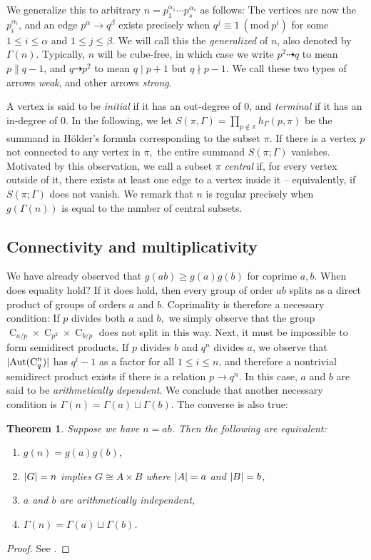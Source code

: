 \documentclass[a4paper, 12pt]{article}
\DeclarePairedDelimiter\abs{\lvert}{\rvert}
\newcommand{\ufdsh}{p_1^{\alpha_1} \cdots p_s^{\alpha_s}}
\newcommand{\aut}[1]{\operatorname{Aut}(#1)}
\newcommand{\cyc}[1]{\operatorname{C}_{#1}}
\newcommand{\Mod}[1]{\ (\mathrm{mod} \ #1)}
\theoremstyle{plain}
\newtheorem{thm}{Theorem}[section]
\theoremstyle{definition}
\begin{document}
We generalize this to arbitrary $n = \ufdsh$ as follows: The vertices are now the $p_i^{\alpha_i}$, and an edge $p^\alpha \rightarrow q^\beta$ exists precisely when $q^j \equiv 1 \Mod{p^i}$ for some $1 \le i \le \alpha$ and $1 \le j \le \beta$. We will call this the \emph{generalized \hg} of $n$, also denoted by $\Gamma(n)$. Typically, $n$ will be cube-free, in which case we write $p^2 \dashrightarrow q$ to mean $p \parallel q - 1$, and $q \dashrightarrow p^2$ to mean $q \mid p + 1$ but $q \nmid p - 1$. We call these two types of arrows \emph{weak}, and other arrows \emph{strong}.

A vertex is said to be \emph{initial} if it has an out-degree of $0$, and \emph{terminal} if it has an in-degree of $0$. In the following, we let $S(\pi, \Gamma) = \prod_{p \notin \pi}h_\Gamma(p, \pi)$ be the summand in Hölder's formula corresponding to the subset $\pi$. If there is a vertex $p$ not connected to any vertex in $\pi,$ the entire summand $S(\pi; \Gamma)$ vanishes. Motivated by this observation, we call a subset $\pi$ \emph{central} if, for every vertex outside of it, there exists at least one edge to a vertex inside it -- equivalently, if $S(\pi; \Gamma)$ does not vanish. We remark that $n$ is regular precisely when $g(\Gamma(n))$ is equal to the number of central subsets.

\subsection{Connectivity and multiplicativity}
We have already observed that $g(ab) \ge g(a)g(b)$ for coprime $a, b$. When does equality hold? If it does hold, then every group of order $ab$ splits as a direct product of groups of orders $a$ and $b.$ Coprimality is therefore a necessary condition: If $p$ divides both $a$ and $b,$ we simply observe that the group $\cyc{a/p} \times \cyc{p^2} \times \cyc{b/p}$ does not split in this way. Next, it must be impossible to form semidirect products. If $p$ divides $b$ and $q^n$ divides $a$, we observe that $\abs{\aut{\cyc{q}^n}}$ has $q^i - 1$ as a factor for all $1 \le i \le n$, and therefore a nontrivial semidirect product exists if there is a relation $p \rightarrow q^n.$ In this case, $a$ and $b$ are said to be \emph{arithmetically dependent}. We conclude that another necessary condition is $\Gamma(n) = \Gamma(a) \sqcup \Gamma(b)$.  The converse is also true:

\begin{thm}
	Suppose we have $n = ab$. Then the following are equivalent:
	\begin{enumerate}
		\item $g(n) = g(a)g(b)$,
		\item $\abs{G} = n$ implies $G \cong A \times B$ where $\abs{A} = a$ and $\abs{B} = b$,
		\item $a$ and $b$ are arithmetically independent,
		\item $\Gamma(n) = \Gamma(a) \sqcup \Gamma(b)$.
	\end{enumerate}
\end{thm}
\begin{proof}
	See {\cite[Lem.~21.19]{monolith}}.
\end{proof}
\end{document}
